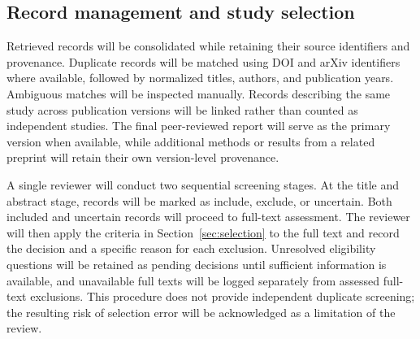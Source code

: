 \documentclass[pdflatex,bst/sn-mathphys-num]{sn-jnl}
\begin{document}

\subsection{Record management and study selection}\label{sec:screening}

Retrieved records will be consolidated while retaining their source identifiers and provenance. Duplicate records will be matched using DOI and arXiv identifiers where available, followed by normalized titles, authors, and publication years. Ambiguous matches will be inspected manually. Records describing the same study across publication versions will be linked rather than counted as independent studies. The final peer-reviewed report will serve as the primary version when available, while additional methods or results from a related preprint will retain their own version-level provenance.

A single reviewer will conduct two sequential screening stages. At the title and abstract stage, records will be marked as include, exclude, or uncertain. Both included and uncertain records will proceed to full-text assessment. The reviewer will then apply the criteria in Section~\ref{sec:selection} to the full text and record the decision and a specific reason for each exclusion. Unresolved eligibility questions will be retained as pending decisions until sufficient information is available, and unavailable full texts will be logged separately from assessed full-text exclusions. This procedure does not provide independent duplicate screening; the resulting risk of selection error will be acknowledged as a limitation of the review.
\end{document}
